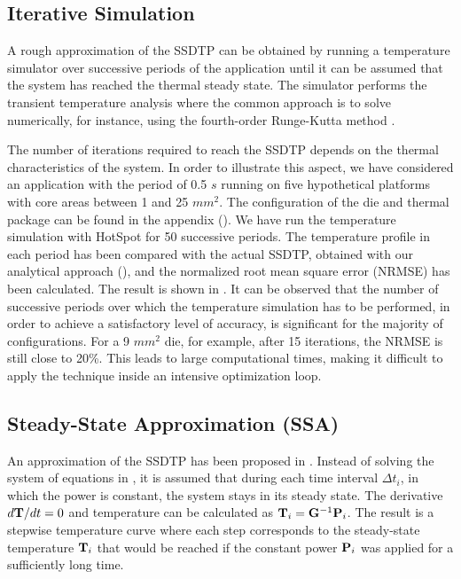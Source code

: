 \subsection{Iterative Simulation} \label{sec:hotspot-iterative-solution}
A rough approximation of the SSDTP can be obtained by running a temperature simulator over successive periods of the application until it can be assumed that the system has reached the thermal steady state. The simulator performs the transient temperature analysis where the common approach is to solve  numerically, for instance, using the fourth-order Runge-Kutta method \cite{press2007}.

The number of iterations required to reach the SSDTP depends on the thermal characteristics of the system. In order to illustrate this aspect, we have considered an application with the period of 0.5 $s$ running on five hypothetical platforms with core areas between 1 and 25 $mm^2$. The configuration of the die and thermal package can be found in the appendix (). We have run the temperature simulation with HotSpot \cite{huang2003} for 50 successive periods. The temperature profile in each period has been compared with the actual SSDTP, obtained with our analytical approach (), and the normalized root mean square error (NRMSE) has been calculated. The result is shown in . It can be observed that the number of successive periods over which the temperature simulation has to be performed, in order to achieve a satisfactory level of accuracy, is significant for the majority of configurations. For a 9 $mm^2$ die, for example, after 15 iterations, the NRMSE is still close to 20\%. This leads to large computational times, making it difficult to apply the technique inside an intensive optimization loop.

\subsection{Steady-State Approximation (SSA)} \label{sec:steady-state-approximation}
An approximation of the SSDTP has been proposed in \cite{huang2009}. Instead of solving the system of equations in , it is assumed that during each time interval $\Delta t_i$, in which the power is constant, the system stays in its steady state. The derivative $d\mathbf{T}/dt = 0$ and temperature can be calculated as $\mathbf{T}_i = \mathbf{G}^{-1} \mathbf{P}_i$. The result is a stepwise temperature curve where each step corresponds to the steady-state temperature $\mathbf{T}_i$ that would be reached if the constant power $\mathbf{P}_i$ was applied for a sufficiently long time.

